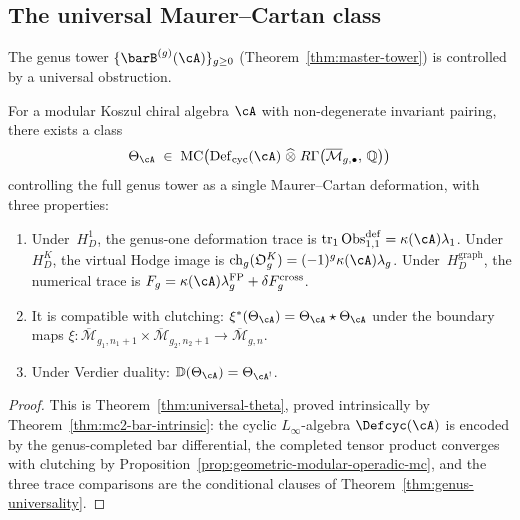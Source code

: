 \subsection{The universal Maurer--Cartan class}

The genus tower $\{\barB^{(g)}(\cA)\}_{g \geq 0}$
(Theorem~\ref{thm:master-tower}) is controlled by a universal
obstruction.

\begin{theorem}\label{thm:universal-MC}
For a modular Koszul chiral algebra $\cA$ with non-degenerate
invariant pairing, there exists a class
\[
\Theta_{\cA} \;\in\;
\operatorname{MC}\!\left(
 \operatorname{Def}_{\mathrm{cyc}}(\cA)
 \;\widehat{\otimes}\;
 R\Gamma\!\left(\overline{\mathcal{M}}_{g,\bullet},\, \mathbb{Q}\right)
\right)
\]
controlling the full genus tower as a single Maurer--Cartan deformation,
with three properties:
\begin{enumerate}[label=\textup{(\roman*)}]
\item Under~$H_D^1$, the genus-one deformation trace is
 $\operatorname{tr}_1\operatorname{Obs}^{\mathrm{def}}_{1,1}
 =\kappa(\cA)\lambda_1$.  Under~$H_D^K$, the virtual Hodge image is
 $\operatorname{ch}_g(\mathfrak O_g^K)
 =(-1)^g\kappa(\cA)\lambda_g$.  Under~$H_D^{\mathrm{graph}}$, the
 numerical trace is
 $F_g=\kappa(\cA)\lambda_g^{\mathrm{FP}}
 +\delta F_g^{\mathrm{cross}}$.
\item It is compatible with clutching:
 $\xi^*(\Theta_{\cA})
 = \Theta_{\cA} \star \Theta_{\cA}$
 under the boundary maps
 $\xi \colon \overline{\mathcal{M}}_{g_1,n_1+1} \times
 \overline{\mathcal{M}}_{g_2,n_2+1} \to
 \overline{\mathcal{M}}_{g,n}$.
\item Under Verdier duality:
 $\mathbb{D}(\Theta_{\cA}) = \Theta_{\cA^!}$.
\end{enumerate}
\end{theorem}

\begin{proof}
This is Theorem~\ref{thm:universal-theta}, proved intrinsically by
Theorem~\ref{thm:mc2-bar-intrinsic}: the cyclic
$L_\infty$-algebra $\Defcyc(\cA)$ is encoded by the genus-completed
bar differential, the completed tensor product converges with
clutching by Proposition~\ref{prop:geometric-modular-operadic-mc},
and the three trace comparisons are the conditional clauses of
Theorem~\ref{thm:genus-universality}.
\end{proof}

